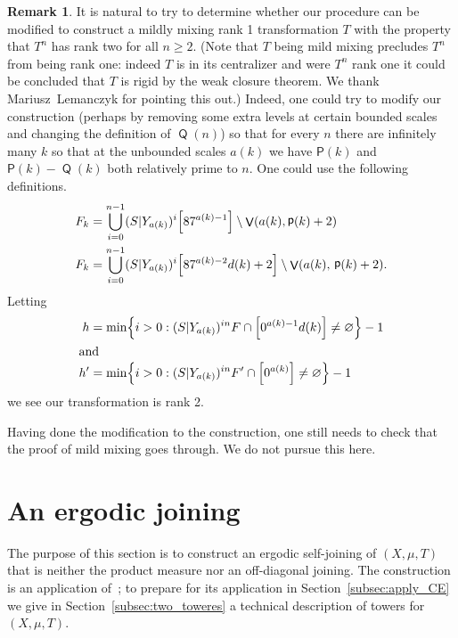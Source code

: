 \documentclass[10pt]{amsart}
\theoremstyle{definition}\newtheorem{defi}[theo]{Definition}\newtheorem{rema}[theo]{Remark}\newtheorem{exam}[theo]{Example}\newtheorem{exem}[theo]{Example}\newtheorem{nota}[theo]{Notation}
\DeclareMathOperator{\bad}{\mathsf{V}}
\DeclareMathOperator{\p}{\mathsf{p}}
\DeclareMathOperator{\Q}{\mathsf{Q}}
\renewcommand{\P}{\mathsf{P}}
\renewcommand{\emptyset}{\varnothing}
\let\originalleft\left
\let\originalright\right
\renewcommand{\left}{\mathopen{}\mathclose\bgroup\originalleft}
\renewcommand{\right}{\aftergroup\egroup\originalright}
\begin{document}
\begin{rema}\label{rem:rank two}
It is natural to try to determine whether our procedure can be modified to construct a mildly mixing rank 1 transformation $T$ with the property that $T^n$ has rank two for all $n\geq 2$. (Note that $T$ being mild mixing precludes $T^n$ from being rank one: indeed $T$ is in its centralizer and were $T^n$ rank one it could be concluded that $T$ is rigid by the weak closure theorem. We thank Mariusz~Lemanczyk for pointing this out.) Indeed, one could try to modify our construction (perhaps by removing some extra levels at certain bounded scales and changing the definition of $\Q(n)$) so that for every $n$ there are infinitely many $k$ so that at the unbounded scales $a(k)$ we have $\P(k)$ and $\P(k)-\Q(k)$ both relatively prime to $n$. One could use the following definitions.
\begin{align*}
F_k &=\bigcup_{i=0}^{n-1}(S|Y_{a(k)})^i\left[87^{a(k)-1}\right]\setminus \bad(a(k),\p(k)+2)
\\
F_k &=\bigcup_{i=0}^{n-1}(S|Y_{a(k)})^i\left[87^{a(k)-2}d(k)+2\right]\setminus \bad(a(k),\,\p(k)+2).
\end{align*}
Letting
\begin{align*}
h &=\min\left\{i>0:(S|Y_{a(k)})^{in}F \cap \left[0^{a(k)-1}d(k)\right] \neq \emptyset\right\}-1
\\
\intertext{and}
h' &=\min\left\{i>0:(S|Y_{a(k)})^{in}F' \cap
\left[0^{a(k)}\right] \neq \emptyset\right\}-1
\end{align*}
we see our transformation is rank 2.

Having done the modification to the construction, one still needs to check that the proof of mild mixing goes through. We do not pursue this here.
\end{rema}

\section{An ergodic joining}\label{sec:ergodic joining}

The purpose of this section is to construct an ergodic self-joining of $(X,\mu,T)$ that is neither the product measure nor an off-diagonal joining. The construction is an application of~\cite[Proposition~3.1]{MR4269425}; to prepare for its application in Section~\ref{subsec:apply_CE} we give in Section~\ref{subsec:two_toweres} a technical description of towers for $(X,\mu,T)$.
\end{document}
